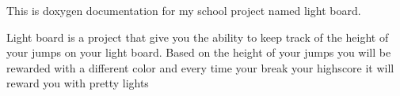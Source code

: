 This is doxygen documentation for my school project named light board.

Light board is a project that give you the ability to keep track of the height of your jumps on your light board. Based on the height of your jumps you will be rewarded with a different color and every time your break your highscore it will reward you with pretty lights 